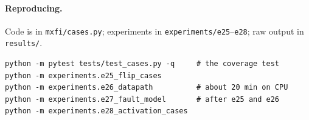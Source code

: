 \documentclass[10pt,a4paper]{article}
\begin{document}
\paragraph{Reproducing.} Code is in \texttt{mxfi/cases.py}; experiments in
\texttt{experiments/e25}--\texttt{e28}; raw output in \texttt{results/}.
\begin{verbatim}
python -m pytest tests/test_cases.py -q     # the coverage test
python -m experiments.e25_flip_cases
python -m experiments.e26_datapath          # about 20 min on CPU
python -m experiments.e27_fault_model       # after e25 and e26
python -m experiments.e28_activation_cases
\end{verbatim}
\end{document}
